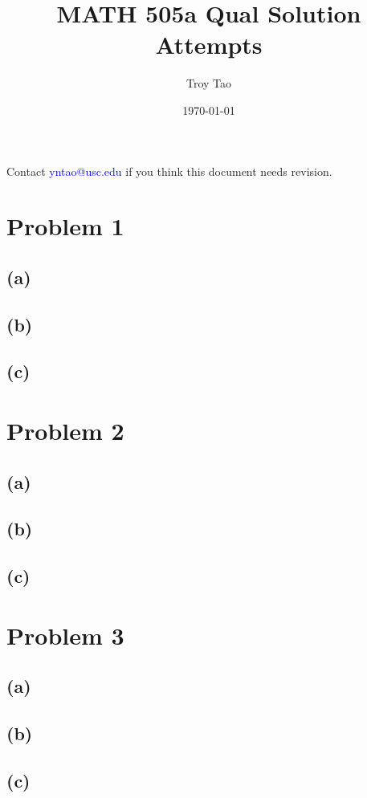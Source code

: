 \documentclass{article}
\title{MATH 505a  Qual Solution Attempts}
\author{Troy Tao}
\date\today
\begin{document}
\maketitle 
Contact \textcolor{blue}{yntao@usc.edu} if you think this document needs revision.


\section*{Problem 1}

\subsection*{(a)}

\color{blue}

\color{black}
\subsection*{(b)}

\color{blue}

\color{black}
\subsection*{(c)}

\color{blue}

\color{black}
\section*{Problem 2}

\subsection*{(a)}

\color{blue}

\color{black}
\subsection*{(b)}

\color{blue}

\color{black}
\subsection*{(c)}

\color{blue}

\color{black}
\section*{Problem 3}

\subsection*{(a)}

\color{blue}

\color{black}
\subsection*{(b)}

\color{blue}

\color{black}
\subsection*{(c)}

\color{blue}
\end{document}
